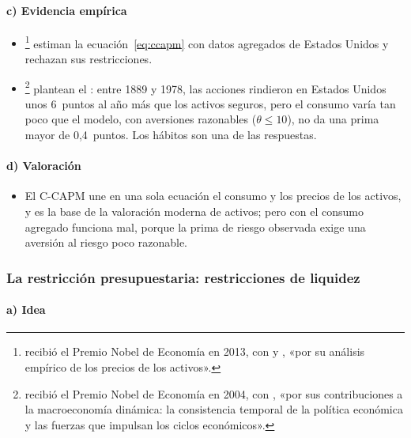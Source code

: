 \documentclass[11pt]{article}
\begin{document}
\paragraph{c) Evidencia empírica}

\begin{itemize}
\item \textcite{HansenSingleton1983Stochastic}\footnote{ recibió el Premio Nobel de Economía en 2013, con  y , «por su análisis empírico de los precios de los activos»\nocite{Nobel2013FamaHansenShiller}.} estiman la ecuación~\eqref{eq:ccapm} con datos agregados de Estados Unidos y rechazan sus restricciones.
\item \textcite{MehraPrescott1985Equity}\footnote{ recibió el Premio Nobel de Economía en 2004, con , «por sus contribuciones a la macroeconomía dinámica: la consistencia temporal de la política económica y las fuerzas que impulsan los ciclos económicos»\nocite{Nobel2004KydlandPrescott}.} plantean el : entre 1889 y 1978, las acciones rindieron en Estados Unidos unos 6~puntos al año más que los activos seguros, pero el consumo varía tan poco que el modelo, con aversiones razonables ($\theta\leq 10$), no da una prima mayor de 0,4~puntos. Los hábitos son una de las respuestas\nocite{CampbellCochrane1999Force}.
\end{itemize}

\paragraph{d) Valoración}

\begin{itemize}
\item El C-CAPM une en una sola ecuación el consumo y los precios de los activos, y es la base de la valoración moderna de activos; pero con el consumo agregado funciona mal, porque la prima de riesgo observada exige una aversión al riesgo poco razonable.
\end{itemize}

\subsubsection{La restricción presupuestaria: restricciones de liquidez}\label{sec:liquidez}

\paragraph{a) Idea}
\end{document}
